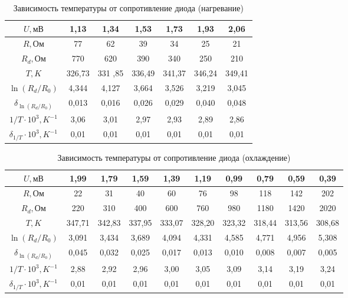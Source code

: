 \documentclass[a4paper,12pt]{article}
\begin{document}
\begin{table}[h]
\centering
\caption{Зависимость температуры от сопротивление диода (нагревание)}
\begin{tabular}{|c|c|c|c|c|c|c|}
\hline
$U, мВ$ & 1,13 & 1,34 & 1,53 & 1,73 & 1,93 & 2,06 \\ \hline
$R, Ом$ & 77 & 62 & 39 & 34 & 25 & 21 \\ \hline
$R_d, Ом$ & 770 & 620 & 390 & 340 & 250 & 210 \\ \hline
$T, K$ & 326,73 & 331
,85 & 336,49 & 341,37 & 346,24 & 349,41 \\ \hline
$\ln (R_d/R_0)$ & 4,344 & 4,127 & 3,664 & 3,526 & 3,219 & 3,045 \\ \hline
$\delta_{\ln (R_d/R_0)}$ & 0,013 & 0,016 & 0,026 & 0,029 & 0,040 & 0,048 \\ \hline
$1/T \cdot 10^3, K^{-1}$ & 3,06 & 3,01 & 2,97 & 2,93 & 2,89 & 2,86 \\ \hline
$\delta_{1/T} \cdot 10^3, K^{-1}$ & 0,01 & 0,01 & 0,01 & 0,01 & 0,01 & 0,01 \\ \hline
\end{tabular}
\end{table}

\begin{table}[h]
\centering
\caption{Зависимость температуры от сопротивление диода (охлаждение)}
\begin{tabular}{|c|c|c|c|c|c|c|c|c|c|}
\hline
$U, мВ$ & 1,99 & 1,79 & 1,59 & 1,39 & 1,19 & 0,99 & 0,79 & 0,59 & 0,39 \\ \hline
$R, Ом$ & 22 & 31 & 40 & 60 & 76 & 98 & 118 & 142 & 202 \\ \hline
$R_d, Ом$ & 220 & 310 & 400 & 600 & 760 & 980 & 1180 & 1420 & 2020 \\ \hline
$T, K$ & 347,71 & 342,83 & 337,95 & 333,07 & 328,20 & 323,32 & 318,44 & 313,56 & 308,68 \\ \hline
$\ln (R_d/R_0)$ & 3,091 & 3,434 & 3,689 & 4,094 & 4,331 & 4,585 & 4,771 & 4,956 & 5,308 \\ \hline
$\delta_{\ln (R_d/R_0)}$ & 0,045 & 0,032 & 0,025 & 0,017 & 0,013 & 0,010 & 0,008 & 0,007 & 0,005 \\ \hline
$1/T \cdot 10^3, K^{-1}$ & 2,88 & 2,92 & 2,96 & 3,00 & 3,05 & 3,09 & 3,14 & 3,19 & 3,24 \\ \hline
$\delta_{1/T} \cdot 10^3, K^{-1}$ & 0,01 & 0,01 & 0,01 & 0,01 & 0,01 & 0,01 & 0,01 & 0,01 & 0,01 \\ \hline
\end{tabular}
\end{table}
\end{document}
